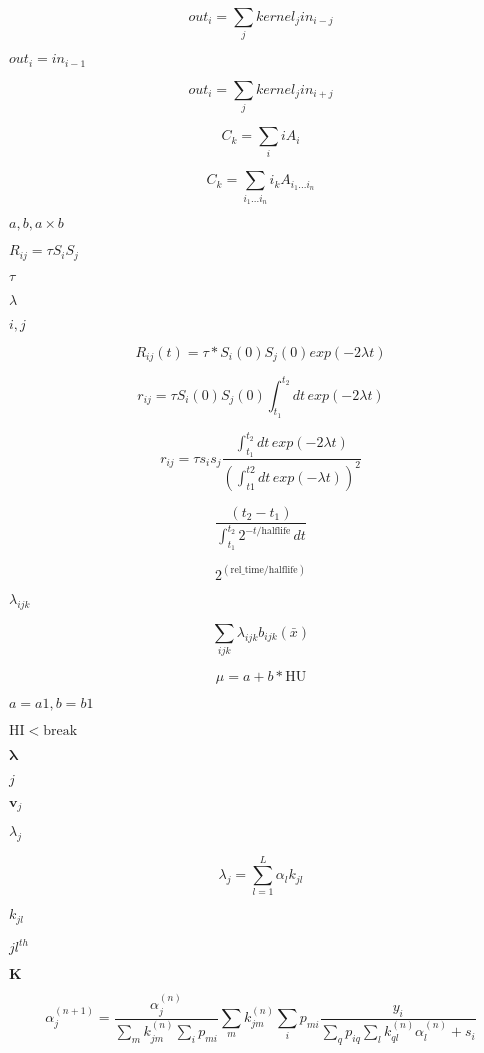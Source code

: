 \documentclass{article}
\begin{document}
\[ out_i = \sum_j kernel_j in_{i-j} \]
\pagebreak

$ out_i = in_{i-1}$
\pagebreak

\[ out_i = \sum_j kernel_j in_{i+j} \]
\pagebreak

\[ C_k = \sum_{i} i A_{i} \]
\pagebreak

\[ C_k = \sum_{i_1...i_n} i_k A_{i_1...i_n} \]
\pagebreak

$ {a, b, a\times b}$
\pagebreak

$ R_{ij}= \tau S_i S_j $
\pagebreak

$\tau$
\pagebreak

$\lambda$
\pagebreak

$i,j$
\pagebreak

\[ R_{ij}(t) = \tau * S_i(0) S_j(0) exp (-2 \lambda t) \]
\pagebreak

\[ r_{ij} = \tau S_i(0) S_j(0) \int_{t_1}^{t_2} dt\,exp (-2 \lambda t) \]
\pagebreak

\[ r_{ij} = \tau s_i s_j \frac{ \int_{t_1}^{t_2} dt\,exp (-2 \lambda t)}{\left(\int_{t1}^{t2} dt\,exp (-\lambda t)\right)^2} \]
\pagebreak

\[ \frac{(t_2-t_1)}{ \int_{t_1}^{t_2} \! 2^{-t/\mathrm{halflife}} \, dt} \]
\pagebreak

\[ 2^{(\mathrm{rel\_time} / \mathrm{halflife})} \]
\pagebreak

$\lambda_{ijk}$
\pagebreak

\[ \sum_{ijk} \lambda_{ijk} b_{ijk}({\bar x}) \]
\pagebreak

\[ \mu = a + b * \mathrm{HU} \]
\pagebreak

$a=a1, b=b1$
\pagebreak

$\mathrm{HI} < \mathrm{break}$
\pagebreak

$ \boldsymbol{\lambda}$
\pagebreak

$ j $
\pagebreak

$ \boldsymbol{v}_j $
\pagebreak

$\lambda_j$
\pagebreak

\[ \lambda_j= \sum_{l=1}^L \alpha_l k_{jl} \]
\pagebreak

$k_{jl}$
\pagebreak

$jl^{th}$
\pagebreak

$\boldsymbol{K}$
\pagebreak

\[ \alpha^{(n+1)}_j = \frac{ \alpha^{(n)}_j }{\sum_{m} k^{(n)}_{jm} \sum_i p_{mi}} \sum_{m}k^{(n)}_{jm}\sum_i p_{mi}\frac{ y_i }{\sum_{q} p_{iq} \sum_l k^{(n)}_{ql}\alpha^{(n)}_l + s_i} \]
\pagebreak
\end{document}
